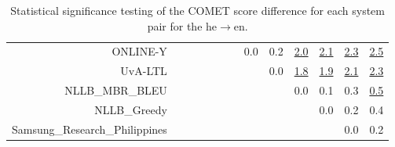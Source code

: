 \documentclass[11pt]{article}
\begin{document}
\begin{sidewaystable}
\begin{center}
{\begin{tabular}{rcccccccccccc}
ONLINE-Y &  &  &  &  &  &  & \cellcolor{red!0} 0.0 & \cellcolor{red!0} 0.2 & \cellcolor{red!70} \underline{2.0} & \cellcolor{red!70} \underline{2.1} & \cellcolor{red!70} \underline{2.3} & \cellcolor{red!70} \underline{2.5}\\ 
UvA-LTL &  &  &  &  &  &  &  & \cellcolor{red!0} 0.0 & \cellcolor{red!70} \underline{1.8} & \cellcolor{red!70} \underline{1.9} & \cellcolor{red!70} \underline{2.1} & \cellcolor{red!70} \underline{2.3}\\ 
NLLB\_MBR\_BLEU &  &  &  &  &  &  &  &  & \cellcolor{red!0} 0.0 & \cellcolor{red!0} 0.1 & \cellcolor{red!0} 0.3 & \cellcolor{red!70} \underline{0.5}\\ 
NLLB\_Greedy &  &  &  &  &  &  &  &  &  & \cellcolor{red!0} 0.0 & \cellcolor{red!0} 0.2 & \cellcolor{red!60} 0.4\\ 
Samsung\_Research\_Philippines &  &  &  &  &  &  &  &  &  &  & \cellcolor{red!0} 0.0 & \cellcolor{red!0} 0.2\\ 
\bottomrule 
\end{tabular} }
\caption{Statistical significance testing of the COMET score difference for each system pair for the he$\rightarrow$en.} 
 \end{center} \end{sidewaystable} 
\end{document}
